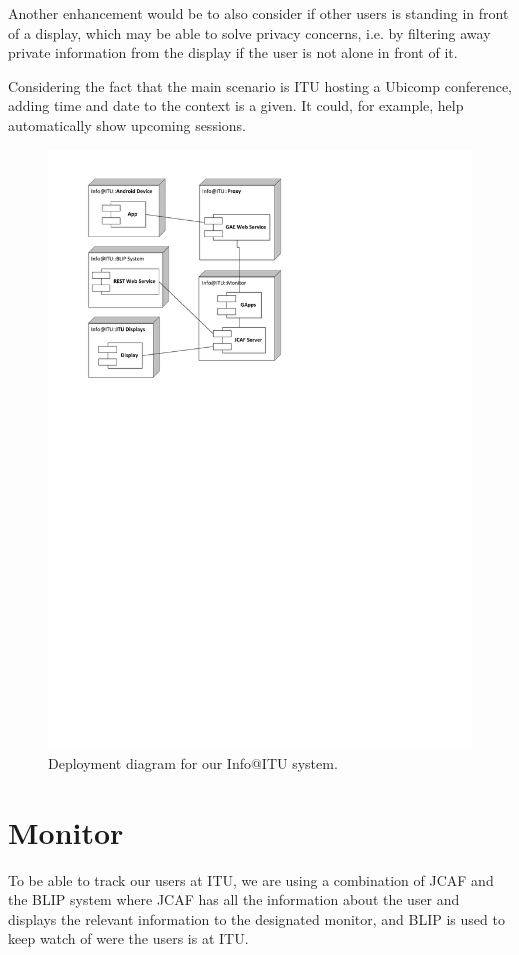 \documentclass{ubicomp2011}
\begin{document}
Another enhancement would be to also consider if other users is standing in front of a display, which may be able to solve privacy concerns, i.e. by filtering away private information from the display if the user is not alone in front of it.

Considering the fact that the main scenario is ITU hosting a Ubicomp conference, adding time and date to the context is a given. It could, for example, help automatically show upcoming sessions.

\begin{figure}[t]
\begin{center}
\includegraphics[width=0.90\columnwidth]{deployment-diagram.pdf}
\end{center}
\caption{Deployment diagram for our Info@ITU system.}
\label{fig:deployment-diagram}
\end{figure}

\section{Monitor}
To be able to track our users at ITU, we are using a combination of JCAF and the BLIP system where JCAF has all the information about the user and displays the relevant information to the designated monitor, and BLIP is used to keep watch of were the users is at ITU.
\end{document}
